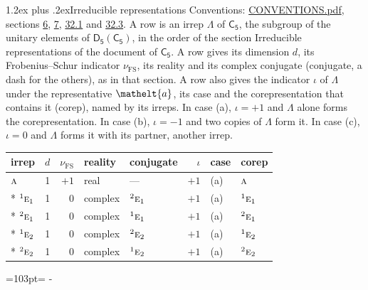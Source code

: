 \documentclass[10pt,a4paper]{article}
\makeatletter
\renewcommand\section{\@startsection{section}{1}{\z@}{-3ex plus -1ex minus -.2ex}%
  {1.2ex plus .2ex}{\normalfont\large\sffamily\bfseries\color{parttitle}}}
\newcommand{\needspace}[1]{\par\penalty-100\begingroup\dimen0=#1\relax\dimen2=\pagegoal
  \advance\dimen2-\pagetotal\ifdim\dimen0>\dimen2\relax\ifdim\dimen2>0pt\vfil\break\fi\fi
  \endgroup}
\numberwithin{equation}{section}
\newcommand{\eltfont}[1]{{\let\sigma\eltsigma\mathelt{#1}}}
\newcommand{\grp}[1]{\mathsf{#1}}
\newcommand{\irr}[1]{\text{\normalfont\scshape #1}}
\newcommand{\conjpair}[1]{{}^{#1}}
\newcommand{\elt}[1]{\eltfont{#1}}
\newcommand{\fsind}{\nu_{\mathrm{FS}}}
\makeatother
\begin{document}
\section{Irreducible representations}\label{s:irreps}
Conventions: \href{../../CONVENTIONS.pdf}{CONVENTIONS.pdf}, sections \href{../../../rotation/CONVENTIONS.pdf\#conv.6}{6}, \href{../../../rotation/CONVENTIONS.pdf\#conv.7}{7}, \href{../../CONVENTIONS.pdf\#conv.32.1}{32.1} and \href{../../CONVENTIONS.pdf\#conv.32.3}{32.3}.
\leavevmode\label{n:irrep.Delta}A row is an irrep $\Lambda$ of $\grp{C_{5}}$, the subgroup of the unitary elements of $\grp{D_{5}}(\grp{C_{5}})$, in the order of the section Irreducible representations of the document of \href{../../../rotation/data/pdf/C5.pdf}{$\grp{C_{5}}$}. \label{n:index.dimension}\label{n:index.frobenius}\label{n:head.irrep}\label{n:head.reality}\label{n:head.conjugate}A row gives its dimension $d$, its Frobenius--Schur indicator $\fsind$, its reality and its complex conjugate (conjugate, a dash for the others), as in that section. \label{n:head.case.corep}\label{n:head.corep}A row also gives the indicator $\iota$ of $\Lambda$ under the representative $\elt{a}$, its case and the corepresentation that contains it (corep), named by its irreps. In case (a), $\iota = +1$ and $\Lambda$ alone forms the corepresentation. In case (b), $\iota = -1$ and two copies of $\Lambda$ form it. In case (c), $\iota = 0$ and $\Lambda$ forms it with its partner, another irrep.
\setlength{\emergencystretch}{2em}\par\setlength{\emergencystretch}{0pt}
{\small\renewcommand{\arraystretch}{1.25}\setlength{\tabcolsep}{4pt}\begin{longtable}{@{}lrrllrll@{}}\toprule
irrep & $d$ & $\fsind$ & reality & conjugate & $\iota$ & case & corep\\\midrule\endhead
\bottomrule\endfoot\endlastfoot
$\irr{a}$ & 1 & $+1$ & real & --- & $+1$ & (a) & $\irr{a}$\\*
$\conjpair{1}\irr{e}_{1}$ & 1 & $0$ & complex & $\conjpair{2}\irr{e}_{1}$ & $+1$ & (a) & $\conjpair{1}\irr{e}_{1}$\\*
$\conjpair{2}\irr{e}_{1}$ & 1 & $0$ & complex & $\conjpair{1}\irr{e}_{1}$ & $+1$ & (a) & $\conjpair{2}\irr{e}_{1}$\\*
$\conjpair{1}\irr{e}_{2}$ & 1 & $0$ & complex & $\conjpair{2}\irr{e}_{2}$ & $+1$ & (a) & $\conjpair{1}\irr{e}_{2}$\\*
$\conjpair{2}\irr{e}_{2}$ & 1 & $0$ & complex & $\conjpair{1}\irr{e}_{2}$ & $+1$ & (a) & $\conjpair{2}\irr{e}_{2}$\\
\bottomrule\end{longtable}}
\needspace{103pt}
\end{document}
